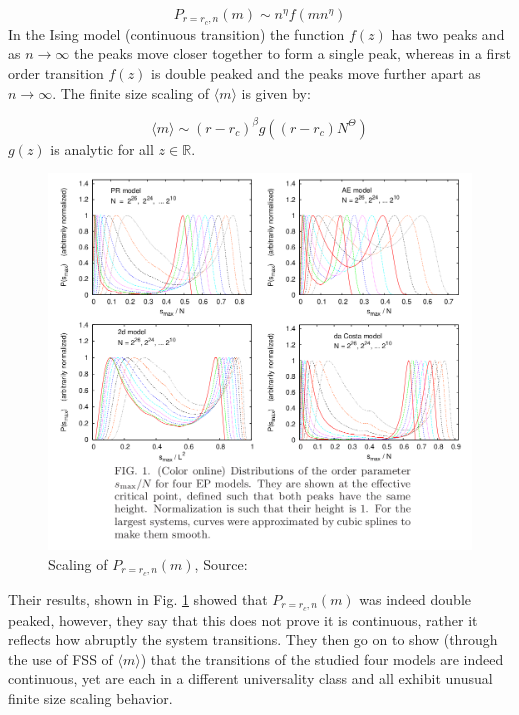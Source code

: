 \begin{equation}
	P_{r=r_c, n}(m) \sim n^\eta f(m n^\eta)
\end{equation}
In the Ising model (continuous transition) the function $f(z)$ has two peaks and as $n \rightarrow \infty$ the peaks move closer together to form a single peak, whereas in a first order transition $f(z)$ is double peaked and the peaks move further apart as $n \rightarrow \infty$.
The finite size scaling of $\langle m \rangle$ is given by:

\begin{equation}
	\langle m \rangle \sim (r - r_c)^\beta g((r - r_c) N^\Theta)
\end{equation}
$g(z)$ is analytic for all $z \in \mathbb{R}$.

\begin{figure}[H]
	\centering
	\includegraphics[width=350pt]{images/grassberger_scaling.png}
	\caption{Scaling of $P_{r=r_c, n}(m)$, Source: \cite{Grassberger_1}}
	\label{fig:grassberger_scaling}
\end{figure}

Their results, shown in Fig. \ref{fig:grassberger_scaling} showed that $P_{r=r_c, n}(m)$ was indeed double peaked, however, they say that this does not prove it is continuous, rather it reflects how abruptly the system transitions.
They then go on to show (through the use of FSS of $\langle m \rangle$) that the transitions of the studied four models are indeed continuous, yet are each in a different universality class and all exhibit unusual finite size scaling behavior.



